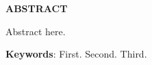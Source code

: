 \vfill
\begin{center}
{\textbf{ABSTRACT}\\}
\end{center}

\noindent

Abstract here.
 
 \vspace{\onelineskip}
    
 \noindent
 \textbf{Keywords}: First. Second. Third.
